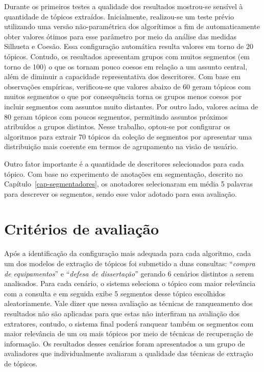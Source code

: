 Durante os primeiros testes a qualidade dos resultados mostrou-se sensível à quantidade de tópicos extraídos.
Inicialmente, realizou-se um teste prévio utilizando uma versão não-paramétrica dos algorítimos a fim de automaticamente obter valores ótimos para esse parâmetro por meio da análise das medidas Silhueta e Coesão. Essa configuração automática resulta valores em torno de 20 tópicos. Contudo, os resultados apresentam grupos com muitos segmentos (em torno de 100) o que os tornam pouco coesos em relação a um assunto central, além de diminuir a capacidade representativa dos descritores.
Com base em observações empíricas, verificou-se que valores abaixo de 60 geram tópicos com muitos segmentos o que por consequência torna os grupos menos coesos por incluir segmentos com assuntos muito distantes. Por outro lado, valores acima de 80 geram tópicos com poucos segmentos, permitindo assuntos próximos atribuídos a grupos distintos. Nesse trabalho, optou-se por configurar os algoritmos para extrair 70 tópicos da coleção de segmentos por apresentar uma distribuição mais coerente em termos de agrupamento na visão de usuário.

Outro fator importante é a quantidade de descritores selecionados para cada tópico. Com base no experimento de anotações em segmentação, descrito no Capítulo~\ref{cap-segmentadores}, os anotadores selecionaram em média 5 palavras para descrever os segmentos, sendo esse valor adotado para essa avaliação.




\section{Critérios de avaliação}


Após a identificação da configuração mais adequada para cada algoritmo, cada um dos modelos de extração de tópicos foi submetido a duas consultas: ``\textit{compra de equipamentos}'' e ``\textit{defesa de dissertação}'' gerando 6 cenários distintos a serem analisados. 
Para cada cenário, o sistema seleciona o tópico com maior relevância com a consulta e em seguida exibe 5 segmentos desse tópico escolhidos aleatoriamente. 
Vale dizer que nessa avaliação as técnicas de ranqueamento dos resultados não são aplicadas para que estas não interfiram na avaliação dos extratores, contudo, o sistema final poderá ranquear também os segmentos com maior relevância de um ou mais tópicos por meio de técnicas de recuperação de informação. 
Os resultados desses cenários foram apresentados a um grupo de avaliadores que individualmente avaliaram a qualidade das técnicas de extração de tópicos. 
%

